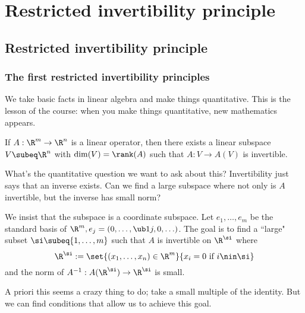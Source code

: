 
\chapter{Restricted invertibility principle}
\section{Restricted invertibility principle}

\subsection{The first restricted invertibility principles}
We take basic facts in linear algebra and make things quantitative. This is the lesson of the course: when you make things quantitative, new mathematics appears.

\begin{pr}
If $A:\R^m\to \R^n$ is a linear operator, then there exists a linear subspace $V\subeq \R^n$ with $\dim(V)=\rank(A)$ such that $A:V\to A(V)$ is invertible. 
\end{pr}

What's the quantitative question we want to ask about this? Invertibility just says that an inverse exists. Can we find a large subspace where not only is $A$ invertible, but the inverse has small norm?

We insist that the subspace is a coordinate subspace.  Let $e_1,\ldots, e_m$ be the standard basis of $\R^m, e_j=(0,\ldots, \ub1j,0,\ldots)$. 
The goal is to find a ``large" subset $\si\subeq \{1,\ldots, m\}$ such that  $A$ is invertible on $\R^\si$ where 
\[
\R^{\si}:=\set{(x_1,\ldots, x_n)\in \R^m}{x_i=0\text{ if }i\nin \si}
\]
and the norm of $A^{-1}:A(\R^\si)\to \R^{\si}$ is small.

A priori this seems a crazy thing to do; take a small multiple of the identity. But we can find conditions that allow us to achieve this goal.

